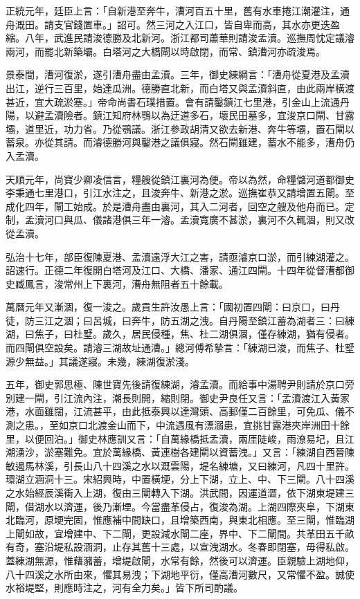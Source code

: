 正統元年，廷臣上言：「自新港至奔牛，漕河百五十里，舊有水車捲江潮灌注，通舟溉田。請支官錢置車。」詔可。然三河之入江口，皆自卑而高，其水亦更迭盈縮。八年，武進民請浚德勝及北新河。浙江都司蕭華則請浚孟瀆。巡撫周忱定議濬兩河，而罷北新築壩。白塔河之大橋閘以時啟閉，而常、鎮漕河亦疏浚焉。

景泰間，漕河復淤，遂引漕舟盡由孟瀆。三年，御史練綱言：「漕舟從夏港及孟瀆出江，逆行三百里，始達瓜洲。德勝直北新，而白塔又與孟瀆斜直，由此兩岸橫渡甚近，宜大疏淤塞。」帝命尚書石璞措置。會有請鑿鎮江七里港，引金山上流通丹陽，以避孟瀆險者。鎮江知府林鶚以為迂道多石，壞民田墓多，宜浚京口閘、甘露壩，道里近，功力省。乃從鶚議。浙江參政胡清又欲去新港、奔牛等壩，置石閘以蓄泉。亦從其請。而濬德勝河與鑿港之議俱寢。然石閘雖建，蓄水不能多，漕舟仍入孟瀆。

天順元年，尚寶少卿凌信言，糧艘從鎮江裏河為便。帝以為然，命糧儲河道都御史李秉通七里港口，引江水注之，且浚奔牛、新港之淤。巡撫崔恭又請增置五閘。至成化四年，閘工始成。於是漕舟盡由裏河，其入二河者，回空之艘及他舟而已。定制，孟瀆河口與瓜、儀諸港俱三年一濬。孟瀆寬廣不甚淤，裏河不久輒涸，則又改從孟瀆。

弘治十七年，部臣復陳夏港、孟瀆遠浮大江之害，請亟濬京口淤，而引練湖灌之。詔速行。正德二年復開白塔河及江口、大橋、潘家、通江四閘。十四年從督漕都御史臧鳳言，浚常州上下裏河，漕舟無阻者五十餘載。

萬曆元年又漸涸，復一浚之。歲貢生許汝愚上言：「國初置四閘：曰京口，曰丹徒，防三江之涸；曰呂城，曰奔牛，防五湖之洩。自丹陽至鎮江蓄為湖者三：曰練湖，曰焦子，曰杜墅。歲久，居民侵種，焦、杜二湖俱涸，僅存練湖，猶有侵者。而四閘俱空設矣。請濬三湖故址通漕。」總河傅希摯言：「練湖已浚，而焦子、杜墅源少無益。」其議遂寢。未幾，練湖復淤淺。

五年，御史郭思極、陳世寶先後請復練湖，濬孟瀆。而給事中湯聘尹則請於京口旁別建一閘，引江流內注，潮長則開，縮則閉。御史尹良任又言：「孟瀆渡江入黃家港，水面雖闊，江流甚平，由此抵泰興以達灣頭、高郵僅二百餘里，可免瓜、儀不測之患。，至如京口北渡金山而下，中流遇風有漂溺患，宜挑甘露港夾岸洲田十餘里，以便回泊。」御史林應訓又言：「自萬緣橋抵孟瀆，兩厓陡峻，雨潦易圮，且江潮湧沙，淤塞難免。宜於萬緣橋、黃連樹各建閘以資蓄洩。」又言：「練湖自西晉陳敏遏馬林溪，引長山八十四溪之水以溉雲陽，堤名練塘，又曰練河，凡四十里許。環湖立涵洞十三。宋紹興時，中置橫埂，分上下湖，立上、中、下三閘。八十四溪之水始經辰溪衝入上湖，復由三閘轉入下湖。洪武間，因運道澀，依下湖東堤建三閘，借湖水以濟運，後乃漸堙。今當盡革侵占，復浚為湖。上湖四際夾阜，下湖東北臨河，原埂完固，惟應補中間缺口，且增築西南，與東北相應。至三閘，惟臨湖上閘如故，宜增建中、下二閘，更設減水閘二座，界中、下二閘間。共革田五千畝有奇，塞沿堤私設涵洞，止存其舊十三處，以宣洩湖水。冬春即閉塞，毋得私啟。蓋練湖無源，惟藉瀦蓄，增堤啟閘，水常有餘，然後可以濟運。臣親驗上湖地仰，八十四溪之水所由來，懼其易洩；下湖地平衍，僅高漕河數尺，又常懼不盈。誠使水裕堤堅，則應時注之，河有全力矣。」皆下所司酌議。

